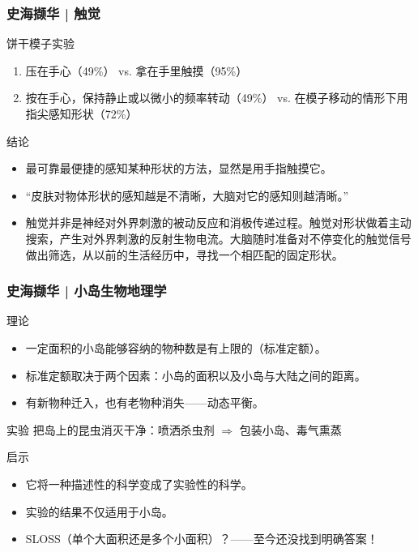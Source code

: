 \begin{frame}
  \frametitle{史海撷华 | 触觉}
  \begin{block}{饼干模子实验}
    \begin{enumerate}
      \item 压在手心（49\%） vs. 拿在手里触摸（95\%）
      \item 按在手心，保持静止或以微小的频率转动（49\%） vs. 在模子移动的情形下用指尖感知形状（72\%）
    \end{enumerate}
  \end{block}
  \pause
  \begin{block}{结论}
    \begin{itemize}
      \item 最可靠最便捷的感知某种形状的方法，显然是用手指触摸它。
      \item “皮肤对物体形状的感知越是不清晰，大脑对它的感知则越清晰。”
      \item 触觉并非是神经对外界刺激的被动反应和消极传递过程。触觉对形状做着主动搜索，产生对外界刺激的反射生物电流。大脑随时准备对不停变化的触觉信号做出筛选，从以前的生活经历中，寻找一个相匹配的固定形状。
    \end{itemize}
  \end{block}
\end{frame}

\begin{frame}
  \frametitle{史海撷华 | 小岛生物地理学}
  \begin{block}{理论}
    \begin{itemize}
      \item 一定面积的小岛能够容纳的物种数是有上限的（标准定额）。
      \item 标准定额取决于两个因素：小岛的面积以及小岛与大陆之间的距离。
      \item 有新物种迁入，也有老物种消失——动态平衡。
    \end{itemize}
  \end{block}
  \pause
  \begin{block}{实验}
    把岛上的昆虫消灭干净：喷洒杀虫剂 $\Longrightarrow$ 包装小岛、毒气熏蒸
  \end{block}
  \pause
  \begin{block}{启示}
    \begin{itemize}
      \item 它将一种描述性的科学变成了实验性的科学。
      \item 实验的结果不仅适用于小岛。
      \item SLOSS（单个大面积还是多个小面积）？——至今还没找到明确答案！
    \end{itemize}
  \end{block}
\end{frame}

